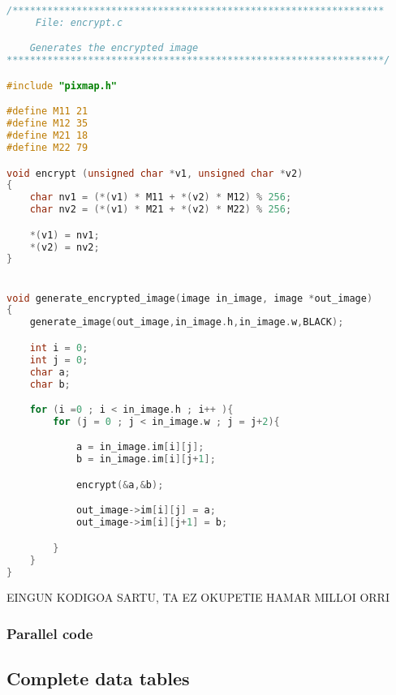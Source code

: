 \documentclass[12pt]{article}
\begin{document}
\begin{lstlisting}[language=C, basicstyle=\footnotesize]
/****************************************************************
     File: encrypt.c

 	Generates the encrypted image
*****************************************************************/

#include "pixmap.h"

#define M11 21
#define M12 35
#define M21 18
#define M22 79

void encrypt (unsigned char *v1, unsigned char *v2)
{
	char nv1 = (*(v1) * M11 + *(v2) * M12) % 256;
	char nv2 = (*(v1) * M21 + *(v2) * M22) % 256;

	*(v1) = nv1;
	*(v2) = nv2;
}


void generate_encrypted_image(image in_image, image *out_image)
{
	generate_image(out_image,in_image.h,in_image.w,BLACK);

	int i = 0;
	int j = 0;
	char a;
	char b;

	for (i =0 ; i < in_image.h ; i++ ){
		for (j = 0 ; j < in_image.w ; j = j+2){

			a = in_image.im[i][j];
			b = in_image.im[i][j+1];

			encrypt(&a,&b);

			out_image->im[i][j] = a;
			out_image->im[i][j+1] = b;

		}
	}
}
\end{lstlisting}

EINGUN KODIGOA SARTU, TA EZ OKUPETIE HAMAR MILLOI ORRI



\subsubsection{Parallel code}\label{parallel_code}

\subsection{Complete data tables}\label{data_tables}
\end{document}
